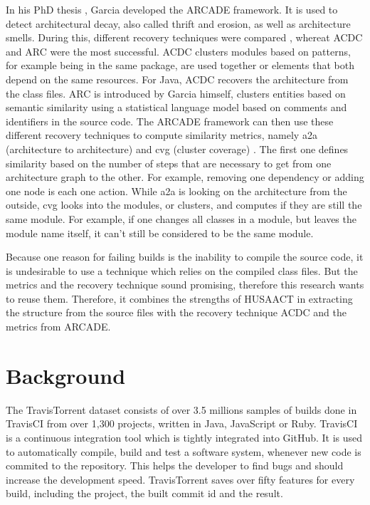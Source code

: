 \documentclass[conference]{IEEEtran}
\begin{document}
In his PhD thesis \cite{arcade-thesis}, Garcia developed the ARCADE framework. It is used to detect architectural decay, also called thrift and erosion, as well as architecture smells. During this, different recovery techniques were compared \cite{arcRec-comparison}, whereat ACDC \cite{ACDC} and ARC were the most successful. 
ACDC clusters modules based on patterns, for example being in the same package, are used together or elements that both depend on the same resources. For Java, ACDC recovers the architecture from the class files. ARC is introduced by Garcia himself, clusters entities based on semantic similarity using a statistical language model based on comments and identifiers in the source code.
The ARCADE framework can then use these different recovery techniques to compute similarity metrics, namely a2a (architecture to architecture) and cvg (cluster coverage) \cite{Arcade}. The first one defines similarity based on the number of steps that are necessary to get from one architecture graph to the other. For example, removing one dependency or adding one node is each one action. While a2a is looking on the architecture from the outside, cvg looks into the modules, or clusters, and computes if they are still the same module. For example, if one changes all classes in a module, but leaves the module name itself, it can't still be considered to be the same module.

Because one reason for failing builds is the inability to compile the source code, it is undesirable to use a technique which relies on the compiled class files. But the metrics and the recovery technique sound promising, therefore this research wants to reuse them. Therefore, it combines the strengths of HUSAACT in extracting the structure from the source files with the recovery technique ACDC and the metrics from ARCADE.

\section{Background}

The TravisTorrent dataset \cite{TravisTorrent} consists of over 3.5 millions samples of builds done in TravisCI from over 1,300 projects, written in Java, JavaScript or Ruby. TravisCI is a continuous integration tool which is tightly integrated into GitHub. It is used to automatically compile, build and test a software system, whenever new code is commited to the repository. This helps the developer to find bugs and should increase the development speed. 
TravisTorrent saves over fifty features for every build, including the project, the built commit id and the result.
\end{document}
